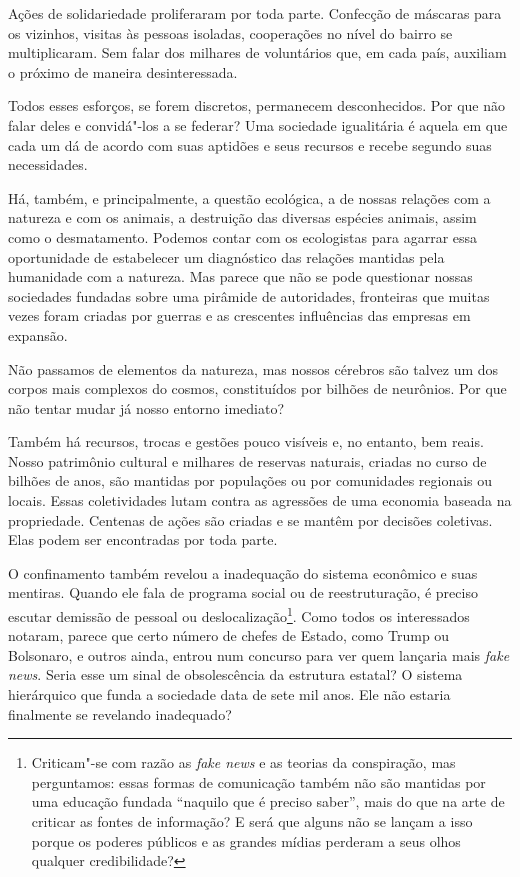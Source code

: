 Ações de solidariedade proliferaram por toda parte. Confecção de
máscaras para os vizinhos, visitas às pessoas isoladas, cooperações no
nível do bairro se multiplicaram. Sem falar dos milhares de voluntários
que, em cada país, auxiliam o próximo de maneira desinteressada.

Todos esses esforços, se forem discretos, permanecem desconhecidos. Por
que não falar deles e convidá"-los a se federar? Uma sociedade
igualitária é aquela em que cada um dá de acordo com suas aptidões e
seus recursos e recebe segundo suas necessidades.

Há, também, e principalmente, a questão ecológica, a de nossas relações
com a natureza e com os animais, a destruição das diversas espécies
animais, assim como o desmatamento. Podemos contar com os ecologistas
para agarrar essa oportunidade de estabelecer um diagnóstico das
relações mantidas pela humanidade com a natureza. Mas parece que não se
pode questionar nossas sociedades fundadas sobre uma pirâmide de
autoridades, fronteiras que muitas vezes foram criadas por guerras e as
crescentes influências das empresas em expansão.

Não passamos de elementos da natureza, mas nossos cérebros são talvez um
dos corpos mais complexos do cosmos, constituídos por bilhões de
neurônios. Por que não tentar mudar já nosso entorno imediato?

Também há recursos, trocas e gestões pouco visíveis e, no entanto, bem
reais. Nosso patrimônio cultural e milhares de reservas naturais,
criadas no curso de bilhões de anos, são mantidas por populações ou por
comunidades regionais ou locais. Essas coletividades lutam contra as
agressões de uma economia baseada na propriedade. Centenas de ações são
criadas e se mantêm por decisões coletivas. Elas podem ser encontradas
por toda parte.

O confinamento também revelou a inadequação do sistema econômico e suas
mentiras. Quando ele fala de programa social ou de reestruturação, é
preciso escutar demissão de pessoal ou deslocalização\footnote{Criticam"-se
  com razão as \emph{fake news} e as teorias da conspiração, mas
  perguntamos: essas formas de comunicação também não são mantidas por
  uma educação fundada ``naquilo que é preciso saber'', mais do que na
  arte de criticar as fontes de informação? E será que alguns não se
  lançam a isso porque os poderes públicos e as grandes mídias perderam
  a seus olhos qualquer credibilidade?}. Como todos os interessados
notaram, parece que certo número de chefes de Estado, como Trump ou
Bolsonaro, e outros ainda, entrou num concurso para ver quem lançaria
mais \emph{fake news}. Seria esse um sinal de obsolescência da estrutura
estatal? O sistema hierárquico que funda a sociedade data de sete mil
anos. Ele não estaria finalmente se revelando inadequado?

